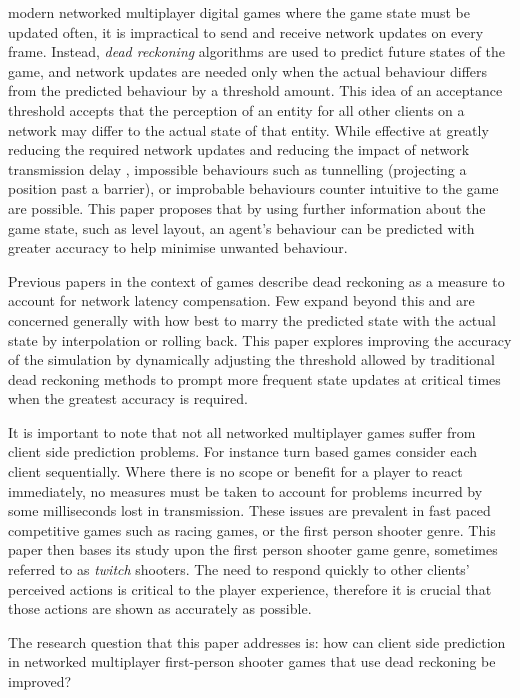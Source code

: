 \documentclass[journal]{IEEEtran}
\begin{document}
 modern networked multiplayer digital games where the game state must be updated often, it is impractical to send and receive network updates on every frame. Instead, \textit{dead reckoning} algorithms are used to predict future states of the game, and network updates are needed only when the actual behaviour differs from the predicted behaviour by a threshold amount. This idea of an acceptance threshold accepts that the perception of an entity for all other clients on a network may differ to the actual state of that entity. While effective at greatly reducing the required network updates and reducing the impact of network transmission delay \cite{pantel2002suitability}, impossible behaviours such as tunnelling (projecting a position past a barrier), or improbable behaviours counter intuitive to the game are possible. This paper proposes that by using further information about the game state, such as level layout, an agent's behaviour can be predicted with greater accuracy to help minimise unwanted behaviour.

Previous papers in the context of games describe dead reckoning as a measure to account for network latency compensation. Few expand beyond this and are concerned generally with how best to marry the predicted state with the actual state by interpolation or rolling back. This paper explores improving the accuracy of the simulation by dynamically adjusting the threshold allowed by traditional dead reckoning methods to prompt more frequent state updates at critical times when the greatest accuracy is required.

It is important to note that not all networked multiplayer games suffer from client side prediction problems. For instance turn based games consider each client sequentially. Where there is no scope or benefit for a player to react immediately, no measures must be taken to account for problems incurred by some milliseconds lost in transmission. These issues are prevalent in fast paced competitive games such as racing games, or the first person shooter genre. This paper then bases its study upon the first person shooter game genre, sometimes referred to as \textit{twitch} shooters. The need to respond quickly to other clients' perceived actions is critical to the player experience, therefore it is crucial that those actions are shown as accurately as possible.

The research question that this paper addresses is: how can client side prediction in networked multiplayer first-person shooter games that use dead reckoning be improved?
\end{document}
